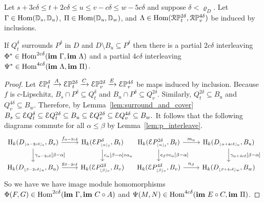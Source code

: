 \begin{lemma}\label{lem:partial_interleaving}
  Let $s + 3c\delta\leq t + 2c\delta\leq u\leq v-c\delta\leq w-5c\delta$ and suppose $\delta < \varrho_D$.
  Let $\Gamma\in\mathrm{Hom}(\mathbb{D}_{s},\mathbb{D}_{u})$, $\Pi\in\mathrm{Hom}(\mathbb{D}_{u},\mathbb{D}_{w})$, and $\Lambda\in\mathrm{Hom}(\mathcal{R}\mathbb{P}_{t}^{2\delta}, \mathcal{R}\mathbb{P}_{v}^{4\delta})$ be induced by inclusions.

  If $Q_{t}^\delta$ surrounds $P^\delta$ in $D$ and $D\setminus B_u\subseteq P^\delta$ then there is a partial $2c\delta$ interleaving $\Phi^*\in\mathrm{Hom}^{2c\delta}(\mathbf{im}~\Gamma, \mathbf{im}~\Lambda)$ and a partial $4c\delta$ interleaving $\Psi^*\in\mathrm{Hom}^{4c\delta}(\mathbf{im}~\Lambda, \mathbf{im}~\Pi)$.
\end{lemma}
\begin{proof}
  Let $\mathcal{E}\mathbb{P}_{t}^{\delta}\xrightarrow{A}\mathcal{E}\mathbb{P}_{t}^{2\delta}\xrightarrow{C}\mathcal{E}\mathbb{P}_{v}^{2\delta}\xrightarrow{E}\mathcal{E}\mathbb{P}_{v}^{4\delta}$ be maps induced by inclusion.
  Because $f$ is $c$-Lipschitz, $B_{s}\cap P^\delta\subseteq Q_{t}^\delta$ and $B_u\cap P^\delta\subseteq Q_{v}^{2\delta}$.
  Similarly, $Q_{t}^{2\delta}\subseteq B_u$ and $Q_{v}^{4\delta}\subseteq B_{w}$.
  Therefore, by Lemma~\ref{lem:surround_and_cover} $B_{s}\subseteq \mathcal{E} Q_{t}^\delta\subseteq\mathcal{E} Q_{t}^{2\delta}\subseteq B_u\subseteq \mathcal{E} Q_{v}^{2\delta}\subseteq \mathcal{E} Q_{v}^{4\delta}\subseteq B_{w}.$
  It follows that the following diagrams commute for all $\alpha\leq\beta$ by Lemma~\ref{lem:p_interleave}.
  \begin{equation}
    \begin{tikzcd}
      \hom_k(D\subi{s}{\alpha-2c\delta}, B_s) \arrow{r}{f_{\alpha-2c\delta}}\arrow{d}{\gamma_{\alpha-2c\delta}[\beta-\alpha]} &
      \hom_k(\E P\subi{t}{\alpha}^\delta, B_t)\arrow{d}{c_\alpha[\beta-\alpha]\circ a_\alpha}\\
      \hom_k(D\subi{u}{\beta-2c\delta}, B_u)\arrow{r}{g_{\beta-2c\delta}} &
      \hom_k(\E P\subi{v}{\beta}^{2\delta}, B_v)
    \end{tikzcd}
    \begin{tikzcd}
      \hom_k(\E P\subi{t}{\alpha}^{2\delta}, B_t)\arrow{d}{e_\beta\circ c_\alpha[\beta-\alpha]}\arrow{r}{m_{\alpha}} &
      \hom_k(D\subi{u}{\alpha+4c\delta}, B_u)\arrow{d}{\gamma_{\alpha+4c\delta}[\beta-\alpha]}\\
      \hom_k(\E P\subi{v}{\beta}^{4\delta}, B_v)\arrow{r}{n_\beta} &
      \hom_k(D\subi{w}{\beta+4c\delta}, B_w)
    \end{tikzcd}
  \end{equation}
  So we have we have image module homomorphisms $\Phi(F, G)\in\mathrm{Hom}^{2c\delta}(\mathbf{im}~\Gamma, \mathbf{im}~C\circ A)$ and $\Psi(M, N)\in\mathrm{Hom}^{4c\delta}(\mathbf{im}~E\circ C, \mathbf{im}~\Pi)$.


\end{proof}
